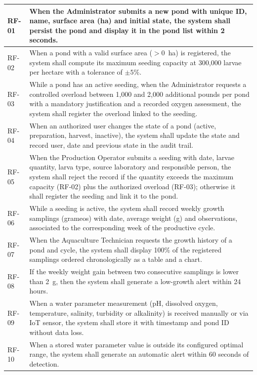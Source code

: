 \documentclass[11pt,a4paper]{article}
\renewcommand{\_}{\textunderscore\allowbreak}
\begin{document}
\begin{longtable}{|p{1.3cm}|p{13.2cm}|}
RF-01 & When the Administrator submits a new pond with unique ID, name, surface area (ha) and initial state, the system shall persist the pond and display it in the pond list within 2 seconds.\\
\hline
RF-02 & When a pond with a valid surface area ($>0$~ha) is registered, the system shall compute its maximum seeding capacity at 300{,}000 larvae per hectare with a tolerance of $\pm5\%$.\\
\hline
RF-03 & While a pond has an active seeding, when the Administrator requests a controlled overload between 1{,}000 and 2{,}000 additional pounds per pond with a mandatory justification and a recorded oxygen assessment, the system shall register the overload linked to the seeding.\\
\hline
RF-04 & When an authorized user changes the state of a pond (active, preparation, harvest, inactive), the system shall update the state and record user, date and previous state in the audit trail.\\
\hline
RF-05 & When the Production Operator submits a seeding with date, larvae quantity, larva type, source laboratory and responsible person, the system shall reject the record if the quantity exceeds the maximum capacity (RF-02) plus the authorized overload (RF-03); otherwise it shall register the seeding and link it to the pond.\\
\hline
RF-06 & While a seeding is active, the system shall record weekly growth samplings (grameos) with date, average weight (g) and observations, associated to the corresponding week of the productive cycle.\\
\hline
RF-07 & When the Aquaculture Technician requests the growth history of a pond and cycle, the system shall display 100\% of the registered samplings ordered chronologically as a table and a chart.\\
\hline
RF-08 & If the weekly weight gain between two consecutive samplings is lower than 2~g, then the system shall generate a low-growth alert within 24 hours.\\
\hline
RF-09 & When a water parameter measurement (pH, dissolved oxygen, temperature, salinity, turbidity or alkalinity) is received manually or via IoT sensor, the system shall store it with timestamp and pond ID without data loss.\\
\hline
RF-10 & When a stored water parameter value is outside its configured optimal range, the system shall generate an automatic alert within 60 seconds of detection.\\

\end{longtable}
\end{document}
